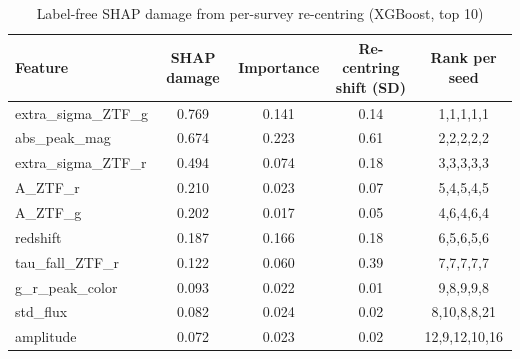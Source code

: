 \begin{table}
\centering
\caption{Label-free SHAP damage from per-survey re-centring (XGBoost, top 10)}
\begin{tabular}{lcccc}
\hline
Feature & SHAP damage & Importance & Re-centring shift (SD) & Rank per seed \\
\hline
extra\_sigma\_ZTF\_g & 0.769 & 0.141 & 0.14 & 1,1,1,1,1 \\
abs\_peak\_mag & 0.674 & 0.223 & 0.61 & 2,2,2,2,2 \\
extra\_sigma\_ZTF\_r & 0.494 & 0.074 & 0.18 & 3,3,3,3,3 \\
A\_ZTF\_r & 0.210 & 0.023 & 0.07 & 5,4,5,4,5 \\
A\_ZTF\_g & 0.202 & 0.017 & 0.05 & 4,6,4,6,4 \\
redshift & 0.187 & 0.166 & 0.18 & 6,5,6,5,6 \\
tau\_fall\_ZTF\_r & 0.122 & 0.060 & 0.39 & 7,7,7,7,7 \\
g\_r\_peak\_color & 0.093 & 0.022 & 0.01 & 9,8,9,9,8 \\
std\_flux & 0.082 & 0.024 & 0.02 & 8,10,8,8,21 \\
amplitude & 0.072 & 0.023 & 0.02 & 12,9,12,10,16 \\
\hline
\end{tabular}
\end{table}
